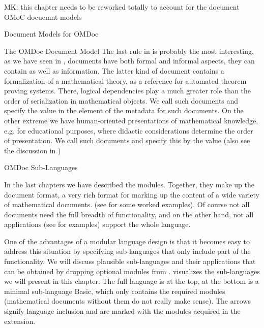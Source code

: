 \begin{oldpart}{MK: this chapter needs to be reworked totally to account for the document
    OMoC docuemnt models}
\begin{tchapter}[id=document-model]{Document Models for OMDoc}
\begin{tsection}[id=omdom]{The OMDoc Document Model}
The last rule in {} is probably the most interesting, as we have seen in
{}, {\omdoc} documents have both formal and informal
aspects, they can contain {} as well as {}
information.  The latter kind of document contains a formalization of a mathematical
theory, as a reference for automated theorem proving systems. There, logical dependencies
play a much greater role than the order of serialization in mathematical objects.  We call
such documents {} and specify the value {} in the
{} element of the {\omdoc} metadata for such documents.  On the
other extreme we have human-oriented presentations of mathematical knowledge, e.g.  for
educational purposes, where didactic considerations determine the order of
presentation. We call such documents {} and specify this by
the value {} (also see the discussion in {})
\end{tsection}

\begin{tsection}[id=sub-languages]{OMDoc Sub-Languages}

  In the last chapters we have described the {\omdoc} modules. Together, they make up the
  {\omdoc} document format, a very rich format for marking up the content of a wide
  variety of mathematical documents. (see {} for some worked
  examples). Of course not all documents need the full breadth of {\omdoc} functionality,
  and on the other hand, not all {\omdoc} applications (see {} for
  examples) support the whole language.

  One of the advantages of a modular language design is that it becomes easy to address
  this situation by specifying sub-languages that only include part of the
  functionality. We will discuss plausible {\omdoc} sub-languages and their applications
  that can be obtained by dropping optional modules from {\omdoc}.
  {} visualizes the sub-languages we will present in this
  chapter. The full language {\omdoc} is at the top, at the bottom is a minimal
  sub-language {\omdoc} Basic, which only contains the required modules (mathematical
  documents without them do not really make sense). The arrows signify language inclusion
  and are marked with the modules acquired in the extension.


\end{tsection}
\end{tchapter}
\end{oldpart}
